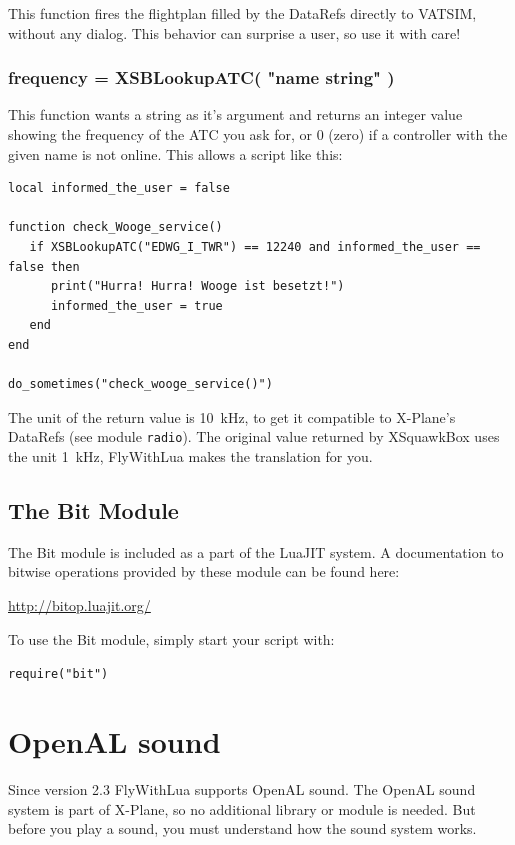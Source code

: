 \documentclass[11pt,parskip=half,a4paper]{scrartcl}
\begin{document}
This function fires the flightplan filled by the DataRefs directly to VATSIM, without any dialog. This behavior can surprise a user, so use it with care!

\subsubsection{frequency = XSBLookupATC( "name string" )}

This function wants a string as it's argument and returns an integer value showing the frequency of the ATC you ask for, or 0 (zero) if a controller with the given name is not online. This allows a script like this:

\begin{lstlisting}
local informed_the_user = false

function check_Wooge_service()
   if XSBLookupATC("EDWG_I_TWR") == 12240 and informed_the_user == false then
      print("Hurra! Hurra! Wooge ist besetzt!")
      informed_the_user = true
   end
end

do_sometimes("check_wooge_service()")
\end{lstlisting}

The unit of the return value is 10~kHz, to get it compatible to X-Plane's DataRefs (see module \verb|radio|). The original value returned by XSquawkBox uses the unit 1~kHz, FlyWithLua makes the translation for you.

\subsection{The Bit Module}

The Bit module is included as a part of the LuaJIT system. A documentation to bitwise operations provided by these module can be found here:

\url{http://bitop.luajit.org/}

To use the Bit module, simply start your script with:

\verb|require("bit")|

\newpage
\section{OpenAL sound}

Since version 2.3 FlyWithLua supports OpenAL sound. The OpenAL sound system is part of X-Plane, so no additional library or module is needed. But before you play a sound, you must understand how the sound system works.
\end{document}
